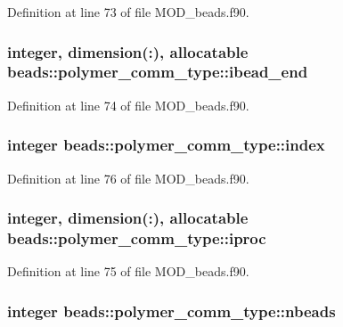 Definition at line 73 of file M\-O\-D\-\_\-beads.\-f90.

\hypertarget{structbeads_1_1polymer__comm__type_a6701e344be0e9be64425096c932711bb}{
\subsubsection[{ibead\-\_\-end}]{\setlength{\rightskip}{0pt plus 5cm}integer, dimension(\-:), allocatable beads\-::polymer\-\_\-comm\-\_\-type\-::ibead\-\_\-end}}\label{structbeads_1_1polymer__comm__type_a6701e344be0e9be64425096c932711bb}


Definition at line 74 of file M\-O\-D\-\_\-beads.\-f90.

\hypertarget{structbeads_1_1polymer__comm__type_a6f34d90af9de91bc1ad5263dc564702f}{
\subsubsection[{index}]{\setlength{\rightskip}{0pt plus 5cm}integer beads\-::polymer\-\_\-comm\-\_\-type\-::index}}\label{structbeads_1_1polymer__comm__type_a6f34d90af9de91bc1ad5263dc564702f}


Definition at line 76 of file M\-O\-D\-\_\-beads.\-f90.

\hypertarget{structbeads_1_1polymer__comm__type_a99e35a43a52000029a3ab65dd2c93938}{
\subsubsection[{iproc}]{\setlength{\rightskip}{0pt plus 5cm}integer, dimension(\-:), allocatable beads\-::polymer\-\_\-comm\-\_\-type\-::iproc}}\label{structbeads_1_1polymer__comm__type_a99e35a43a52000029a3ab65dd2c93938}


Definition at line 75 of file M\-O\-D\-\_\-beads.\-f90.

\hypertarget{structbeads_1_1polymer__comm__type_a8a6e8b05d395c41432e8a7cbd1440144}{
\subsubsection[{nbeads}]{\setlength{\rightskip}{0pt plus 5cm}integer beads\-::polymer\-\_\-comm\-\_\-type\-::nbeads}}\label{structbeads_1_1polymer__comm__type_a8a6e8b05d395c41432e8a7cbd1440144}


